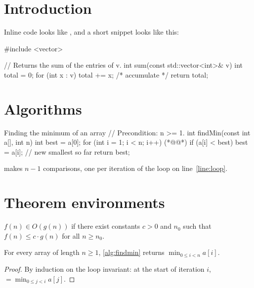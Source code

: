 \documentclass[11pt]{article}
\begin{document}

\section{Introduction}

Inline code looks like , and a short snippet
looks like this:

\begin{cpp}
#include <vector>

// Returns the sum of the entries of v.
int sum(const std::vector<int>& v) {
    int total = 0;
    for (int x : v) {
        total += x; /* accumulate */
    }
    return total;
}
\end{cpp}

\section{Algorithms}

\begin{algorithm}[label=alg:findmin]{Finding the minimum of an array}
// Precondition: n >= 1.
int findMin(const int a[], int n) {
    int best = a[0];
    for (int i = 1; i < n; i++) {    (*@\label{line:loop}@*)
        if (a[i] < best) {
            best = a[i];             // new smallest so far
        }
    }
    return best;
}
\end{algorithm}

 makes $n - 1$ comparisons, one per iteration of the loop
on line~\ref{line:loop}.

\section{Theorem environments}

\begin{definition}[Big-O]\label{def:bigo}
  $f(n) \in O(g(n))$ if there exist constants $c > 0$ and $n_0$ such that
  $f(n) \le c \cdot g(n)$ for all $n \ge n_0$.
\end{definition}

\begin{theorem}\label{thm:findmin}
  For every array  of length $n \ge 1$, \cref{alg:findmin}
  returns $\min_{0 \le i < n} a[i]$.
\end{theorem}

\begin{proof}
  By induction on the loop invariant: at the start of iteration $i$,
   $= \min_{0 \le j < i} a[j]$.
\end{proof}
\end{document}

